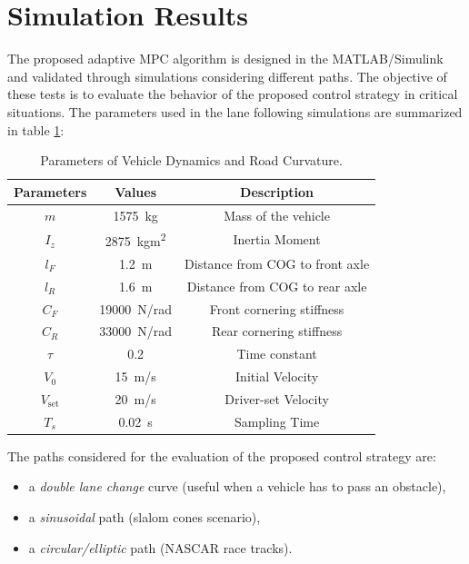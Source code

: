 \section{Simulation Results}
The proposed adaptive MPC algorithm is designed in the MATLAB/Simulink and validated through simulations considering different paths. The objective of these tests is to evaluate the behavior of the proposed control strategy in critical situations. The parameters used in the lane following simulations are summarized in table \ref{tab:params}:
\begin{table}[!h]
	\centering
	\begin{tabular}{|c|c|c|}
		\hline
		\bfseries Parameters          & \bfseries Values   & \bfseries Description   \\
		\hline
		$m$          & \SI{1575}{kg}  & Mass of the vehicle            \\
		$I_z$         & \SI{2875}{kgm^2}   & Inertia Moment            \\
		$l_F$           & \SI{1.2}{m}     & Distance from COG to front axle         \\
		$l_R$         & \SI{1.6}{m}    & Distance from COG to rear axle           \\
		$C_F$          & \SI{19000}{\newton/rad}&Front cornering stiffness      \\
		$C_R$           & \SI{33000}{\newton/rad}&Rear cornering stiffness  \\
		$\tau$             & 0.2    & Time constant            \\
		$V_0$           & \SI{15}{m/s} & Initial Velocity      \\
		$V_{\text{set}}$          & \SI{20}{m/s} & Driver-set Velocity  \\
		$T_s$         & \SI{0.02}{s} & Sampling Time
		         \\
		\hline
	\end{tabular}
	\caption{Parameters of Vehicle Dynamics and Road Curvature.}
	\label{tab:params}
\end{table}

The paths considered for the evaluation of the proposed control strategy are:
\begin{itemize}
	\item a \textit{double lane change} curve (useful when a vehicle has to pass an obstacle), 
	\item a \textit{sinusoidal} path (slalom cones scenario),
	\item a \textit{circular/elliptic} path (NASCAR race tracks).
\end{itemize} 

